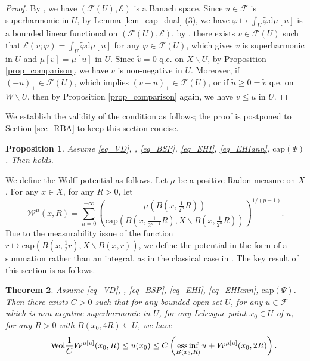 \documentclass[11pt,a4paper]{article}
\numberwithin{equation}{section}
\newcommand{\einf}{\operatorname*{ess\,inf}}
\theoremstyle{plain}
\newtheorem{theorem}{Theorem}[section]
\newtheorem{proposition}[theorem]{Proposition}
\theoremstyle{definition}
\begin{document}
\begin{proof}
By \cite[Lemma 4.1]{Yan25c}, we have $(\mathcal{F}(U),\mathcal{E})$ is a Banach space. Since $u\in\mathcal{F}$ is superharmonic in $U$, by Lemma \ref{lem_cap_dual} (3), we have $\varphi\mapsto\int_U\widetilde{\varphi}\mathrm{d}\mu[u]$ is a bounded linear functional on $(\mathcal{F}(U),\mathcal{E})$, by \cite[Theorem 3.24]{KS24a}, there exists $v\in\mathcal{F}(U)$ such that $\mathcal{E}(v;\varphi)=\int_U\widetilde{\varphi}\mathrm{d}\mu[u]$ for any $\varphi\in \mathcal{F}(U)$, which gives $v$ is superharmonic in $U$ and $\mu[v]=\mu[u]$ in $U$. Since $\widetilde{v}=0$ q.e. on $X\backslash U$, by Proposition \ref{prop_comparison}, we have $v$ is non-negative in $U$. Moreover, if $(-u)_+\in \mathcal{F}(U)$, which implies $(v-u)_+\in \mathcal{F}(U)$, or if $\widetilde{u}\ge0=\widetilde{v}$ q.e. on $W\backslash U$, then by Proposition \ref{prop_comparison} again, we have $v\le u$ in $U$.
\end{proof}

We establish the validity of the \hyperlink{eq_RBA}{} condition as follows; the proof is postponed to Section \ref{sec_RBA} to keep this section concise.

\begin{proposition}\label{prop_RBA}
Assume \ref{eq_VD}, \hyperlink{eq_LSC}{}, \ref{eq_BSP}, \ref{eq_EHI}, \ref{eq_EHIann}, \hyperlink{eq_cap}{$\text{cap}(\Psi)$}. Then \hyperlink{eq_RBA}{} holds.
\end{proposition}

We define the Wolff potential as follows. Let $\mu$ be a positive Radon measure on $X$. For any $x\in X$, for any $R>0$, let
$$\mathcal{W}^\mu(x,R)=\sum_{n=0}^{+\infty} \left(\frac{\mu(B(x,\frac{1}{2^n}R))}{\mathrm{cap}(B(x,\frac{1}{2^{n+1}}R),X\backslash B(x,\frac{1}{2^n}R))}\right)^{{1}/{(p-1)}}.$$
Due to the measurability issue of the function $r\mapsto \mathrm{cap}(B(x,\frac{1}{2}r),X\backslash B(x,r))$, we define the potential in the form of a summation rather than an integral, as in the classical case in \cite{KM92Pisa,KM94Acta}. The key result of this section is as follows.

\begin{theorem}\label{thm_Wolff}
Assume \ref{eq_VD}, \hyperlink{eq_LSC}{}, \ref{eq_BSP}, \ref{eq_EHI}, \ref{eq_EHIann}, \hyperlink{eq_cap}{$\text{cap}(\Psi)$}. Then there exists $C>0$ such that for any bounded open set $U$, for any $u\in\mathcal{F}$ which is non-negative superharmonic in $U$, for any Lebesgue point $x_0\in U$ of $u$, for any $R>0$ with $B(x_0,4R)\subseteq U$, we have
\begin{equation*}\label{eq_Wolff}\tag*{$\text{Wol}$}
\frac{1}{C}\mathcal{W}^{\mu[u]}(x_0,R)\le u(x_0)\le C \left(\einf_{B(x_0,R)}u+\mathcal{W}^{\mu[u]}(x_0,2R)\right).
\end{equation*}
\end{theorem}
\end{document}
